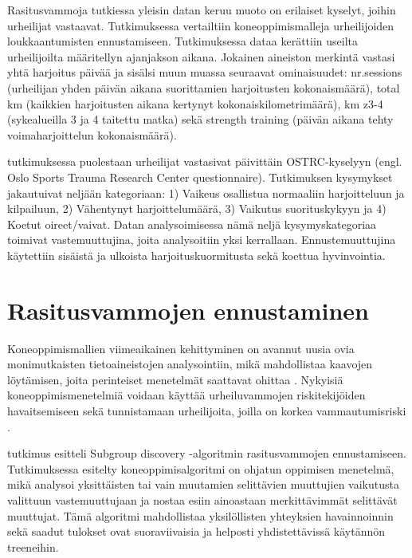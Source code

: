 \documentclass[utf8, bachelor]{gradu3}
\begin{document}
Rasitusvammoja tutkiessa yleisin datan keruu muoto on erilaiset kyselyt, joihin urheilijat vastaavat. Tutkimuksessa \parencite{murugan_comparison_2025} 
vertailtiin koneoppimismalleja urheilijoiden loukkaantumisten ennustamiseen. Tutkimuksessa dataa kerättiin useilta urheilijoilta määritellyn ajanjakson aikana. 
Jokainen aineiston merkintä vastasi yhtä harjoitus päivää ja sisälsi muun muassa seuraavat ominaisuudet: nr.sessions (urheilijan yhden päivän aikana suorittamien 
harjoitusten kokonaismäärä), total km (kaikkien harjoitusten aikana kertynyt kokonaiskilometrimäärä), km z3-4 (sykealueilla 3 ja 4 taitettu matka) sekä strength 
training (päivän aikana tehty voimaharjoittelun kokonaismäärä). 

\textcite{de_leeuw_personalized_2022} tutkimuksessa puolestaan urheilijat vastasivat päivittäin OSTRC-kyselyyn (engl. Oslo Sports Trauma 
Research Center questionnaire). Tutkimuksen kysymykset jakautuivat neljään kategoriaan: 1) Vaikeus osallistua normaaliin harjoitteluun ja kilpailuun, 2) Vähentynyt harjoittelumäärä,
3) Vaikutus suorituskykyyn ja 4) Koetut oireet/vaivat. Datan analysoimisessa nämä neljä kysymyskategoriaa toimivat vastemuuttujina, joita analysoitiin yksi kerrallaan.
Ennustemuuttujina käytettiin sisäistä ja ulkoista harjoituskuormitusta sekä koettua hyvinvointia.


\section{Rasitusvammojen ennustaminen}

Koneoppimismallien viimeaikainen kehittyminen on avannut uusia ovia monimutkaisten tietoaineistojen analysointiin, mikä mahdollistaa kaavojen löytämisen, 
joita perinteiset menetelmät saattavat ohittaa \parencite{murugan_comparison_2025}. Nykyisiä koneoppimismenetelmiä voidaan käyttää urheiluvammojen riskitekijöiden 
havaitsemiseen sekä tunnistamaan urheilijoita, joilla on korkea vammautumisriski \parencite{van_eetvelde_machine_2021}.

\textcite{de_leeuw_personalized_2022} tutkimus esitteli Subgroup discovery -algoritmin rasitusvammojen ennustamiseen. Tutkimuksessa esitelty koneoppimisalgoritmi on ohjatun oppimisen 
menetelmä, mikä analysoi yksittäisten tai vain muutamien selittävien muuttujien vaikutusta valittuun vastemuuttujaan ja nostaa esiin ainoastaan merkittävimmät selittävät muuttujat. 
Tämä algoritmi mahdollistaa yksilöllisten yhteyksien havainnoinnin sekä saadut tulokset ovat suoraviivaisia ja helposti yhdistettävissä käytännön treeneihin.
\end{document}
